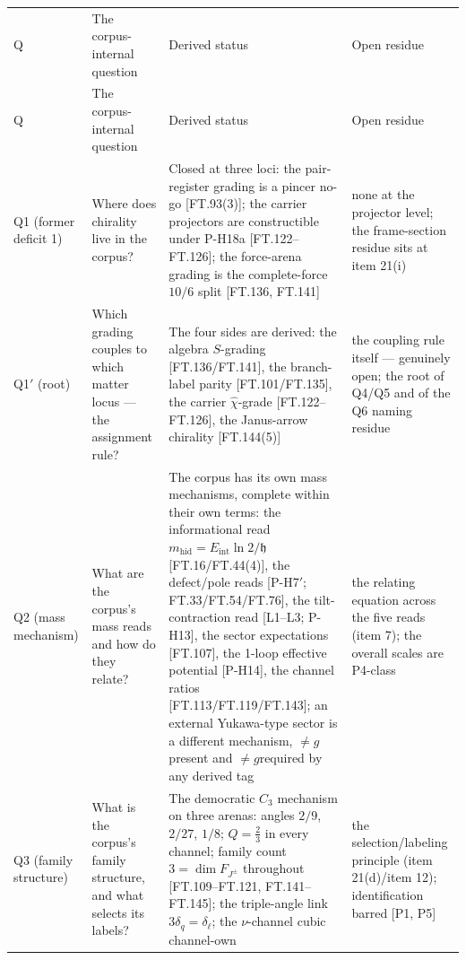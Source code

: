 \documentclass[11pt,openany]{report}
\theoremstyle{canonplain}
\theoremstyle{canondef}
\begin{document}
{\scriptsize\setlength{\tabcolsep}{4pt}
\begin{longtable}{>{\raggedright\arraybackslash}p{}|>{\raggedright\arraybackslash}p{}|>{\raggedright\arraybackslash}p{}|>{\raggedright\arraybackslash}p{}}
\toprule
Q & The corpus-internal question & Derived status & Open residue \\
\addlinespace[2pt]
\midrule
\endfirsthead
\toprule
Q & The corpus-internal question & Derived status & Open residue \\
\addlinespace[2pt]
\midrule
\endhead
\bottomrule
\endlastfoot
Q1 (former deficit 1) & Where does chirality live in the corpus? & Closed at three loci: the pair-register grading is a pincer no-go [FT.93(3)]; the carrier projectors are constructible under P-H18a [FT.122–FT.126]; the force-arena grading is the complete-force $10/6$ split [FT.136, FT.141] & none at the projector level; the frame-section residue sits at item 21(i) \\
Q1$'$ (root) & Which grading couples to which matter locus — the assignment rule? & The four sides are derived: the algebra $S$-grading [FT.136/FT.141], the branch-label parity [FT.101/FT.135], the carrier $\hat\chi$-grade [FT.122–FT.126], the Janus-arrow chirality [FT.144(5)] & the coupling rule itself — genuinely open; the root of Q4/Q5 and of the Q6 naming residue \\
Q2 (mass mechanism) & What are the corpus's mass reads and how do they relate? & The corpus has its own mass mechanisms, complete within their own terms: the informational read $m_{\mathrm{hid}}=\allowbreak E_{\mathrm{int}}\ln2/\mathfrak h$ [FT.16/FT.44(4)], the defect/pole reads [P-H7$'$; FT.33/FT.54/FT.76], the tilt-contraction read [L1–L3; P-H13], the sector expectations [FT.107], the 1-loop effective potential [P-H14], the channel ratios [FT.113/FT.119/FT.143]; an external Yukawa-type sector is a different mechanism, $\ne\allowbreak g$present and $\ne\allowbreak g$required by any derived tag & the relating equation across the five reads (item 7); the overall scales are P4-class \\
Q3 (family structure) & What is the corpus's family structure, and what selects its labels? & The democratic $C_3$ mechanism on three arenas: angles $2/9$, $2/27$, $1/8$; $Q=\allowbreak \tfrac23$ in every channel; family count $3=\allowbreak \dim F_{J^\pm}$ throughout [FT.109–FT.121, FT.141–FT.145]; the triple-angle link $3\delta_q=\allowbreak \delta_\ell$; the $\nu$-channel cubic channel-own & the selection/labeling principle (item 21(d)/item 12); identification barred [P1, P5] \\

\end{longtable}}
\end{document}
